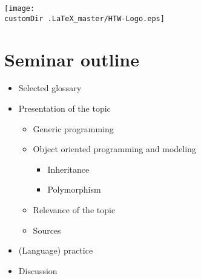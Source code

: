 \newcommand{\customDir}{../}








%

\date{May 4, 2016} 



\begin{frame}[plain]
\begin{center}
\texttt{[image: \\customDir .LaTeX\_master/HTW-Logo.eps]}
\end{center}
\maketitle
\end{frame}
\section*{Seminar outline}
\begin{frame}
\begin{itemize}
\setlength\itemsep{1em}
\item Selected glossary
\item Presentation of the topic
\begin{itemize}
\item Generic programming
\item Object oriented programming and modeling
\begin{itemize}
\item Inheritance
\item Polymorphism
\end{itemize}
\item Relevance of the topic
\item Sources
\end{itemize}
\item (Language) practice
\item Discussion
\end{itemize}
\end{frame}

